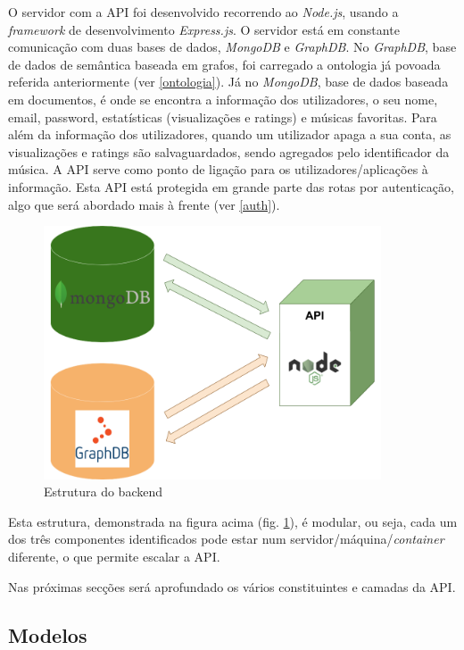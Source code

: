 \documentclass{article}
\begin{document}
O servidor com a API foi desenvolvido recorrendo ao \textit{Node.js}, usando a \textit{framework} de desenvolvimento \textit{Express.js}. O servidor está em constante comunicação com duas bases de dados, \textit{MongoDB} e \textit{GraphDB}. No \textit{GraphDB}, base de dados de semântica baseada em grafos, foi carregado a ontologia já povoada referida anteriormente (ver \ref{ontologia}). Já no \textit{MongoDB}, base de dados baseada em documentos, é onde se encontra a informação dos utilizadores, o seu nome, email, password, estatísticas (visualizações e ratings) e músicas favoritas. Para além da informação dos utilizadores, quando um utilizador apaga a sua conta, as visualizações e ratings são salvaguardados, sendo agregados pelo identificador da música. A API serve como ponto de ligação para os utilizadores/aplicações à informação. Esta API está protegida em grande parte das rotas por autenticação, algo que será abordado mais à frente (ver \ref{auth}).

\begin{figure}[H]
    \centering
    \includegraphics[width=10cm]{Pictures/backend.png}
    \caption{Estrutura do backend}
    \label{backend}
\end{figure}

Esta estrutura, demonstrada na figura acima (fig. \ref{backend}), é modular, ou seja, cada um dos três componentes identificados pode estar num servidor/máquina/\textit{container} diferente, o que permite escalar a API.

Nas próximas secções será aprofundado os vários constituintes e camadas da API.

\subsection{Modelos}
\end{document}
